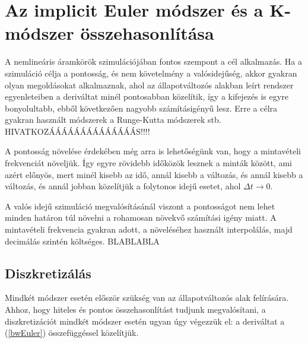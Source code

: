 \chapter{Az implicit Euler módszer és a K-módszer összehasonlítása}

A nemlineáris áramkörök szimulációjában fontos szempont a cél alkalmazás. Ha a szimuláció célja a pontosság, és nem követelmény a valósidejűség, akkor gyakran olyan megoldásokat alkalmaznak, ahol az állapotváltozós alakban leírt rendszer egyenleteiben a deriváltat minél pontosabban közelítik, így a kifejezés is egyre bonyolultabb, ebből következően nagyobb számításigényű lesz. Erre a célra gyakran használt módszerek a Runge-Kutta módszerek stb. HIVATKOZÁÁÁÁÁÁÁÁÁÁÁÁÁÁS!!!!

A pontosság növelése érdekében még arra is lehetőségünk van, hogy a mintavételi frekvenciát növeljük. Így egyre rövidebb időközök lesznek a minták között, ami azért előnyös, mert minél kisebb az idő, annál kisebb a változás, és annál kisebb a változás, és annál jobban közelítjük a folytonos idejű esetet, ahol $\Delta t \rightarrow 0$. 

A valós idejű szimuláció megvalósításánál viszont a pontosságot nem lehet minden határon túl növelni a rohamosan növekvő számítási igény miatt. A mintavételi frekvencia gyakran adott, a növeléséhez használt interpolálás, majd decimálás szintén költséges. BLABLABLA

\section{Diszkretizálás}
Mindkét módszer esetén először szükség van az állapotváltozós alak felírására. Ahhoz, hogy hiteles és pontos összehasonlítást tudjunk megvalósítani, a diszkretizációt mindkét módszer esetén ugyan úgy végezzük el: a deriváltat a (\ref{bwEuler}) összefüggéssel közelítjük.

